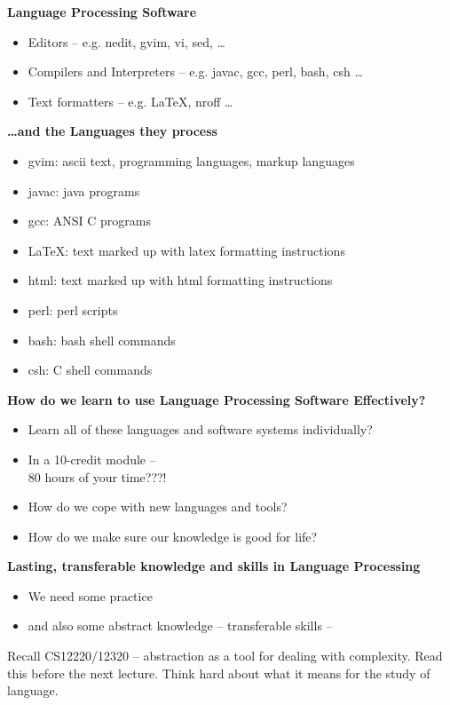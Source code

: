 %
%
\begin{slide}{}
{\bf Language Processing Software}
\begin{itemize}
\item Editors -- e.g. nedit, gvim, vi, sed, \ldots
\item Compilers and Interpreters -- e.g. javac, gcc, perl, bash, csh \ldots
\item Text formatters -- e.g. \LaTeX, nroff \ldots
\end{itemize}
\end{slide}
%
%
\begin{slide}{}
{\small
{\bf \ldots and the Languages they process}
\begin{itemize}
\item gvim: ascii text, programming languages, markup languages
\item javac: java programs
\item gcc: ANSI C programs
\item LaTeX: text marked up with latex formatting instructions
\item html: text marked up with html formatting instructions
\item perl: perl scripts
\item bash: bash shell commands
\item csh: C shell commands
\end{itemize}
}
\end{slide}
%
%
\begin{slide}{}
{\bf How do we learn to use Language Processing Software Effectively?}
\begin{itemize}
\item Learn all of these languages and software systems individually?
\item In a 10-credit module -- \\ 80 hours of your time???!
\item How do we cope with new languages and tools?
\item How do we make sure our knowledge is good for life?
\end{itemize}
\end{slide}
%
%
\begin{slide}{}
{\bf Lasting, transferable knowledge and skills in Language Processing}

\begin{itemize}
\item We need some practice 
\item and also some abstract knowledge -- transferable skills -- 
\end{itemize}

Recall CS12220/12320 -- abstraction as a tool for dealing with complexity.
Read this before the next lecture. Think hard about what it means for
the study of language.
\end{slide}
